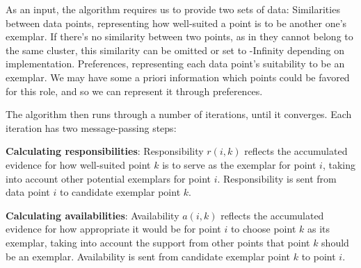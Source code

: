 \documentclass[a4paper, 12pt]{article}
\begin{document}
As an input, the algorithm requires us to provide two sets of data:
    Similarities between data points, representing how well-suited a point is to be another one’s exemplar. If there’s no similarity between two points, as in they cannot belong to the same cluster, this similarity can be omitted or set to -Infinity depending on implementation.
    Preferences, representing each data point’s suitability to be an exemplar. We may have some a priori information which points could be favored for this role, and so we can represent it through preferences.

The algorithm then runs through a number of iterations, until it converges. Each iteration has two message-passing steps:

    \textbf{Calculating responsibilities}: Responsibility $r(i, k)$ reflects the accumulated evidence for how well-suited point $k$ is to serve as the exemplar for point $i$, taking into account other potential exemplars for point $i$. Responsibility is sent from data point $i$ to candidate exemplar point $k$.

    \textbf{Calculating availabilities}: Availability $a(i, k)$ reflects the accumulated evidence for how appropriate it would be for point $i$ to choose point $k$ as its exemplar, taking into account the support from other points that point $k$ should be an exemplar. Availability is sent from candidate exemplar point $k$ to point $i$.
\end{document}
